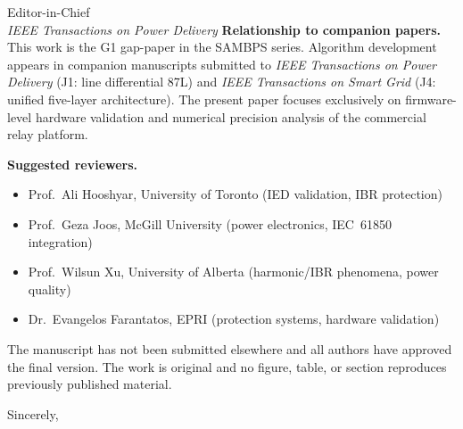 \documentclass[11pt,a4paper]{letter}
\begin{document}
\begin{letter}{Editor-in-Chief\\
               \textit{IEEE Transactions on Power Delivery}}
\medskip
\noindent\textbf{Relationship to companion papers.}
This work is the G1 gap-paper in the SAMBPS series.  Algorithm development appears
in companion manuscripts submitted to \textit{IEEE Transactions on Power Delivery}
(J1: line differential 87L) and \textit{IEEE Transactions on Smart Grid}
(J4: unified five-layer architecture).  The present paper focuses exclusively on
firmware-level hardware validation and numerical precision analysis of the commercial
relay platform.

\medskip
\noindent\textbf{Suggested reviewers.}
\begin{itemize}
  \item Prof.\ Ali Hooshyar, University of Toronto
        (IED validation, IBR protection)
  \item Prof.\ Geza Joos, McGill University
        (power electronics, IEC~61850 integration)
  \item Prof.\ Wilsun Xu, University of Alberta
        (harmonic/IBR phenomena, power quality)
  \item Dr.\ Evangelos Farantatos, EPRI
        (protection systems, hardware validation)
\end{itemize}

\medskip
\noindent
The manuscript has not been submitted elsewhere and all authors have approved the
final version.  The work is original and no figure, table, or section reproduces
previously published material.

\closing{Sincerely,}

\end{letter}
\end{document}
